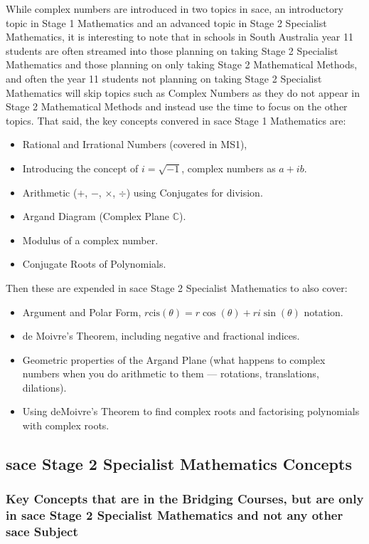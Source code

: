 \documentclass[twoside,12pt,a4paper]{report}
\begin{document}
While complex numbers are introduced in two topics in \gls{sace}, an introductory topic in Stage 1 Mathematics and an advanced topic in Stage 2 Specialist Mathematics, it is interesting to note that in schools in South Australia year 11 students are often streamed into those planning on taking Stage 2 Specialist Mathematics and those planning on only taking Stage 2 Mathematical Methods, and often the year 11 students not planning on taking Stage 2 Specialist Mathematics will skip topics such as Complex Numbers as they do not appear in Stage 2 Mathematical Methods and instead use the time to focus on the other topics. That said, the key concepts convered in \gls{sace} Stage 1 Mathematics are:
\begin{itemize}
	\item Rational and Irrational Numbers (covered in MS1), 
	\item Introducing the concept of $i = \sqrt{-1}$, complex numbers as $a + ib$.
	\item Arithmetic ($+$, $-$, $\times$, $\div$) using Conjugates for division.
	\item Argand Diagram (Complex Plane $\mathbb{C}$).
	\item Modulus of a complex number.
	\item Conjugate Roots of Polynomials.
\end{itemize}
Then these are expended in \gls{sace} Stage 2 Specialist Mathematics to also cover:
\begin{itemize}
	\item Argument and Polar Form, $r\text{cis}(\theta) = r\cos(\theta) + ri\sin(\theta)$ notation.
	\item de Moivre's Theorem, including negative and fractional indices.
	\item Geometric properties of the Argand Plane (what happens to complex numbers when you do arithmetic to them --- rotations, translations, dilations).
	\item Using deMoivre's Theorem to find complex roots and factorising polynomials with complex roots.
\end{itemize}


\subsection{\gls{sace} Stage 2 Specialist Mathematics Concepts}

\subsubsection{Key Concepts that are in the Bridging Courses, but are only in \gls{sace} Stage 2 Specialist Mathematics and not any other \gls{sace} Subject}
\end{document}
